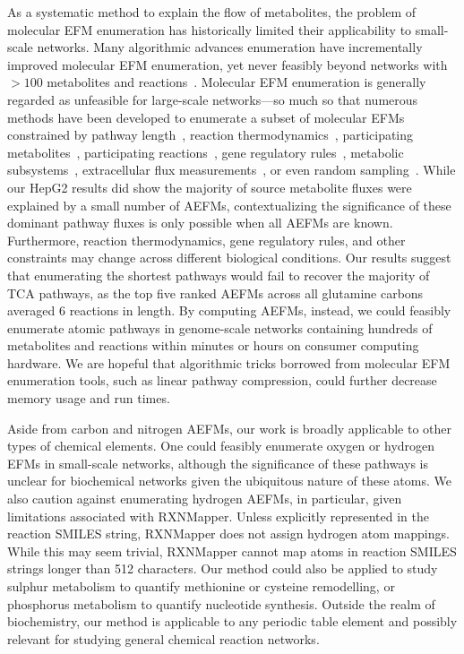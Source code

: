 \documentclass[12pt]{article}
\begin{document}
As a systematic method to explain the flow of metabolites, the problem of
molecular EFM enumeration has historically limited their applicability to
small-scale networks. Many algorithmic advances enumeration have
incrementally improved molecular EFM enumeration, yet never feasibly
beyond networks with $>100$ metabolites and
reactions~\citep{KampAxelvon2006M5fa,TerzerMarco2008Lcoe,vanKlinkenJanBert2016Faet}.
Molecular EFM enumeration is generally regarded as unfeasible for
large-scale networks---so much so that numerous methods have been
developed to enumerate a subset of molecular EFMs constrained by pathway
length~\citep{deFigueiredoLuisF2009Ctse}, reaction
thermodynamics~\citep{GerstlMatthiasP2015Mief}, participating
metabolites~\citep{PeyJon2014Dcoe}, participating
reactions~\citep{KaletaChristoph2009Ctwb}, gene regulatory
rules~\citep{JungreuthmayerChristian2013rSue}, metabolic
subsystems~\citep{SchusterS2002Etps,SchwartzJean-Marc2007Omfa},
extracellular flux
measurements~\citep{SoonsZitaITA2011Iomm,JungersRaphaelM.2011Fcom}, or
even random sampling~\citep{MachadoDaniel2012Rsoe}. While our HepG2
results did show the majority of source metabolite fluxes were explained
by a small number of AEFMs, contextualizing the significance of these
dominant pathway fluxes is only possible when all AEFMs are known.
Furthermore, reaction thermodynamics, gene regulatory rules, and other
constraints may change across different biological conditions. Our results
suggest that enumerating the shortest pathways would fail to recover the
majority of TCA pathways, as the top five ranked AEFMs across all
glutamine carbons averaged 6 reactions in length. By computing AEFMs,
instead, we could feasibly enumerate atomic pathways in genome-scale
networks containing hundreds of metabolites and reactions within minutes
or hours on consumer computing hardware. We are hopeful that algorithmic
tricks borrowed from molecular EFM enumeration tools, such as linear
pathway compression, could further decrease memory usage and run times.

Aside from carbon and nitrogen AEFMs, our work is broadly applicable to
other types of chemical elements. One could feasibly enumerate oxygen or
hydrogen EFMs in small-scale networks, although the significance of these
pathways is unclear for biochemical networks given the ubiquitous nature
of these atoms. We also caution against enumerating hydrogen AEFMs, in
particular, given limitations associated with RXNMapper. Unless explicitly
represented in the reaction SMILES string, RXNMapper does not assign
hydrogen atom mappings. While this may seem trivial, RXNMapper cannot map
atoms in reaction SMILES strings longer than 512 characters. Our method
could also be applied to study sulphur metabolism to quantify methionine
or cysteine remodelling, or phosphorus metabolism to quantify nucleotide
synthesis. Outside the realm of biochemistry, our method is applicable to
any periodic table element and possibly relevant for studying general
chemical reaction networks. 
\end{document}
